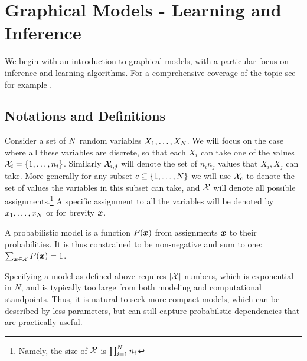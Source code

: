 \section{Graphical Models - Learning and Inference}
We begin with an introduction to graphical models, with a particular focus on inference and learning algorithms. For a comprehensive coverage of the topic see for example \cite{koller2009probabilistic}.
\subsection{Notations and Definitions}
\label{sec:def}
Consider a set of $N$ random variables $X_1,\ldots,X_{N}$. We will focus on the case where all these variables are discrete,  so that each $X_i$ can take one of the values ${\cal X}_i = \{1,\ldots,n_i\}$. Similarly ${\cal X}_{i,j}$ will denote the set of $n_i n_j$ values that $X_i,X_j$ can take. More generally for any subset $c\subseteq \{1,\ldots,N\}$ we will use ${\cal X}_c$ to denote the set of values the variables in this subset can take, and ${\cal X}$ will denote all possible assignments.\footnote{Namely, the size of ${\cal X}$ is $\prod_{i=1}^{N} n_i$} A specific assignment to all the variables will be denoted by $x_1,\ldots,x_{N}$ or for brevity $\boldsymbol{x}$. 

A probabilistic model is a function $P(\boldsymbol{x})$ from assignments $\boldsymbol{x}$ to their probabilities. It is thus constrained to be non-negative and sum to one: $\sum_{\boldsymbol{x} \in {\cal X}} P(\boldsymbol{x}) = 1$.

Specifying a model as defined above requires $|{\cal X}|$ numbers, which is exponential in $N$, and is typically too large from both modeling and computational standpoints. Thus, it is natural to seek more compact models, which can be described by less parameters, but can still capture probabilstic dependencies that are practically useful.

